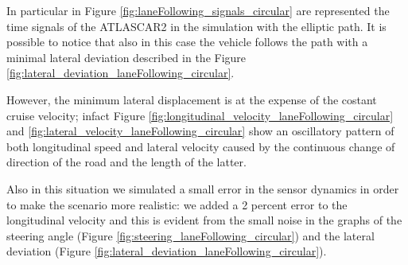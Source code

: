 In particular in Figure \ref{fig:laneFollowing_signals_circular} are represented the time signals of the ATLASCAR2 in the simulation with the elliptic path. It is possible to notice that also in this case the vehicle follows the path with a minimal lateral deviation described in the Figure \ref{fig:lateral_deviation_laneFollowing_circular}.

However, the minimum lateral displacement is at the expense of the costant cruise velocity; infact Figure \ref{fig:longitudinal_velocity_laneFollowing_circular} and \ref{fig:lateral_velocity_laneFollowing_circular} show an oscillatory pattern of both longitudinal speed and lateral velocity caused by the continuous change of direction of the road and the length of the latter. 

Also in this situation we simulated a small error in the sensor dynamics in order to make the scenario more realistic: we added a 2 percent error to the longitudinal velocity and this is evident from the small noise in the graphs of the steering angle (Figure \ref{fig:steering_laneFollowing_circular}) and the lateral deviation (Figure \ref{fig:lateral_deviation_laneFollowing_circular}).

